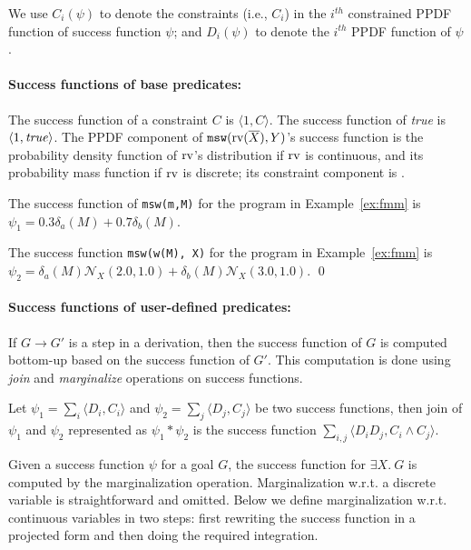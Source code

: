 We use $C_{i}(\psi)$ to denote the
constraints (i.e., $C_{i}$) in the $i^{th}$ constrained PPDF function of
success function $\psi$;
and $D_{i}(\psi)$ to denote the $i^{th}$ PPDF
function of $\psi$.


\paragraph{Success functions of base predicates:}
The success function of a constraint $C$ is $\langle 1, C\rangle$.
The success function of \emph{true} is $\langle 1, \mbox{\it true\/}\rangle$.
The PPDF component of $\mathtt{msw}(\mbox{\rm rv}(\overline{X}), Y)$'s success
function  is the
probability density function of $\mbox{\rm rv}$'s distribution if $\mbox{\rm rv}$ is
continuous, and its probability mass function if $\mbox{\rm rv}$ is discrete; its constraint component
is .

\begin{Ex}
The success function of \texttt{msw(m,M)} for the program in
Example~\ref{ex:fmm} is $\psi_1 = 0.3 \delta_{a}(M) + 0.7 \delta_{b}(M)$.

The success function \texttt{msw(w(M), X)} for the program in
Example~\ref{ex:fmm} is 
$\psi_2 =  \delta_{a}(M) \mathcal{N}_{X}(2.0, 1.0) +  \delta_{b}(M) \mathcal{N}_{X}(3.0, 1.0)$.
\qed
\end{Ex}


\paragraph{Success functions of user-defined predicates:}
If $G \rightarrow G'$ is a step in a derivation, then the success
function of $G$ is computed bottom-up based on the success
function of $G'$.  This computation is done using \emph{join} and
\emph{marginalize} operations on success functions.

\begin{Def} [Join]
Let $\psi_{1}=\sum_{i} \langle D_{i}, C_{i} \rangle$ and $\psi_{2} =
\sum_{j} \langle D_{j}, C_{j} \rangle$ be two success functions, then
join of $\psi_{1}$ and $\psi_{2}$ represented as $\psi_{1} * \psi_{2}$
is the success function $\sum_{i,j} \langle D_{i}D_{j}, C_{i} \wedge
C_{j} \rangle$. 
\end{Def}


Given a success function $\psi$ for a goal $G$, the success function
for $\exists X.\ G$ is computed by the marginalization operation.
Marginalization w.r.t. a discrete variable is straightforward and
omitted.  Below we
define marginalization w.r.t. continuous variables in two steps: first
rewriting the success function in a projected form and then doing the
required integration.

